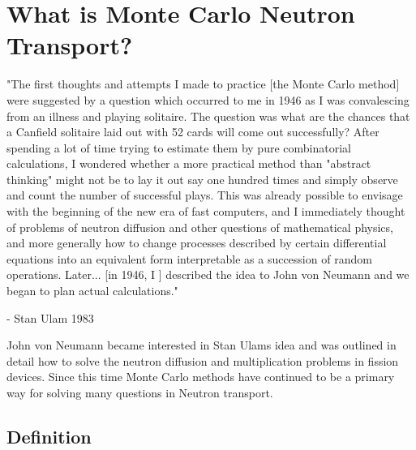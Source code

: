 \section{What is Monte Carlo Neutron Transport?}

%	
%	

\begin{displayquote}
"The first thoughts and attempts I made to practice [the Monte Carlo method] were suggested by a question which occurred to me in 1946 as I was convalescing from an illness and playing solitaire. The question was what are the chances that a Canfield solitaire laid out with 52 cards will come out successfully? After spending a lot of time trying to estimate them by pure combinatorial calculations, I wondered whether a more practical method than "abstract thinking" might not be to lay it out say one hundred times and simply observe and count the number of successful plays. This was already possible to envisage with the beginning of the new era of fast computers, and I immediately thought of problems of neutron diffusion and other questions of mathematical physics, and more generally how to change processes described by certain differential equations into an equivalent form interpretable as a succession of random operations. Later... [in 1946, I ] described the idea to John von Neumann and we began to plan actual calculations."
\end{displayquote}
\begin{displayquote}
- Stan Ulam 1983 ~\cite{theMCM}
\end{displayquote}

John von Neumann became interested in Stan Ulams idea and was outlined in detail how to solve the neutron diffusion and multiplication problems in fission devices.
%
Since this time Monte Carlo methods have continued to be a primary way for solving many questions in Neutron transport. ~\cite{theMCM}
%

\subsection{Definition}

